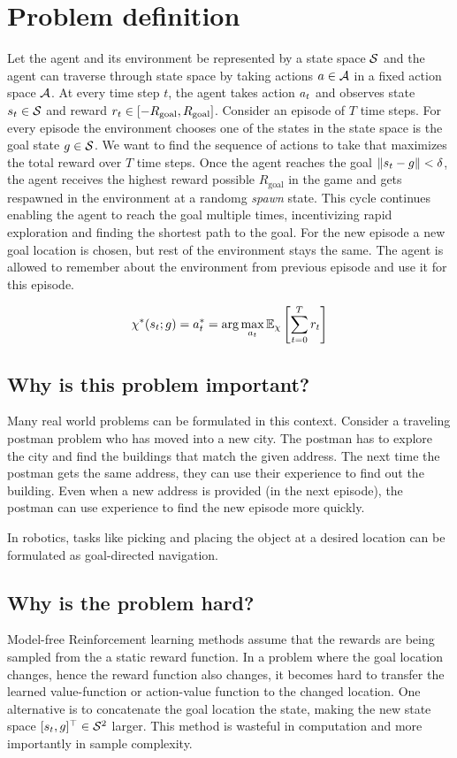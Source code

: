 \section{Problem definition}
\newcommand{\Rgoal}{R_{\text{goal}}}
Let the agent and its environment be represented by a state space
$\mathcal{S}$ and the agent can traverse through state space by taking
actions $a \in \mathcal{A}$ in a fixed action space $\mathcal{A}$. At every time
step $t$, the agent takes action $a_t$ and observes state $s_t
\in \mathcal{S}$ and reward $\rew_t \in [-\Rgoal, \Rgoal]$.  Consider an
episode of $T$ time steps.  For every episode the environment chooses
one of the states in the state space is the goal state $g \in
\mathcal{S}$.  We want to find the sequence of actions to take that maximizes
the total reward over $T$ time steps.  Once the agent reaches the goal
$\|s_t - g\| < \delta$, the agent receives the highest reward
possible $\Rgoal$ in the game and gets respawned in the environment at a
randomg \emph{spawn} state.  This cycle continues enabling the agent to
reach the goal multiple times, incentivizing rapid exploration and
finding the shortest path to the goal.  For the new episode a new goal
location is chosen, but rest of the environment stays the same.  The
agent is allowed to remember about the environment from previous episode
and use it for this episode.

%
\begin{align}
\chi^*(s_t ; g) = a^*_t = \arg \max_{a_t} \mathbb{E}_{\chi}\left[ \sum_{t=0}^T r_t \right]
\end{align}%
%

\subsection{Why is this problem important?}
Many real world problems can be formulated in this context.
Consider a traveling postman problem who has moved into a new city. The postman has
to explore the city and find the buildings that match the given address.
The next time the postman gets the same address, they can use their experience to find out the building.
Even when a new address is provided (in the next episode), the postman can use
experience to find the new episode more quickly.

In robotics, tasks like picking and placing the object at a desired location can be
formulated as goal-directed navigation.

\subsection{Why is the problem hard?}
Model-free Reinforcement learning methods assume that the rewards are being sampled
from the a static reward function.
In a problem where the goal location changes, hence the reward function also changes,
it becomes hard to transfer the learned value-function or action-value function to
the changed location.
One alternative is to concatenate the goal location the state, making the new state space
$[s_t, g]^\top \in \mathcal{S}^2$ larger.
This method is wasteful in computation and more importantly in sample complexity.

